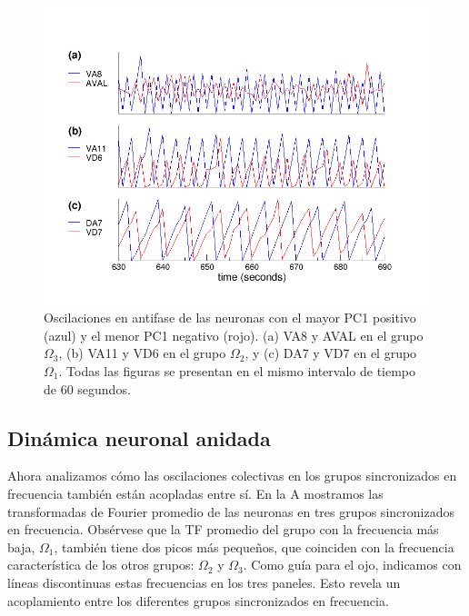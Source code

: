  \begin{figure}[h!]
	\centering\includegraphics[width=\imsize]{antifase.png}
	\caption[ Sincronización de frecuencias ordenada según el análisis de componentes principales.]{Oscilaciones en antifase de las neuronas con el mayor PC1 positivo (azul) y el menor PC1 negativo (rojo). (a) VA8 y AVAL en el grupo $\Omega_3$, (b) VA11 y VD6 en el grupo $\Omega_2$, y (c) DA7 y VD7 en el grupo $\Omega_1$. Todas las figuras se presentan en el mismo intervalo de tiempo de 60 segundos.}\label{fig:antifase}
\end{figure}

\subsection{Dinámica neuronal anidada}

Ahora analizamos cómo las oscilaciones colectivas en los grupos sincronizados en frecuencia también están acopladas entre sí. En la A mostramos las transformadas de Fourier promedio de las neuronas en tres grupos sincronizados en frecuencia. Obsérvese que la TF promedio del grupo con la frecuencia más baja, $\Omega_1$, también tiene dos picos más pequeños, que coinciden con la frecuencia característica de los otros grupos: $\Omega_2$ y $\Omega_3$. Como guía para el ojo, indicamos con líneas discontinuas estas frecuencias en los tres paneles. Esto revela un acoplamiento entre los diferentes grupos sincronizados en frecuencia.

